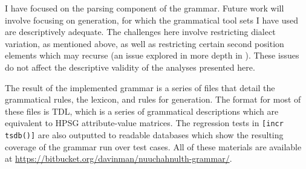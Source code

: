 I have focused on the parsing component of the grammar. Future work will involve focusing on generation, for which the grammatical tool sets I have used are descriptively adequate. The challenges here involve restricting dialect variation, as mentioned above, as well as restricting certain second position elements which may recurse (an issue explored in more depth in \citealt{bender2010reweaving}). These issues do not affect the descriptive validity of the analyses presented here.


The result of the implemented grammar is a series of files that detail the grammatical rules, the lexicon, and rules for generation. The format for most of these files is TDL, which is a series of grammatical descriptions which are equivalent to HPSG attribute-value matrices. The regression tests in \texttt{[incr tsdb()]} \citep{oepen2001} are also outputted to readable databases which show the resulting coverage of the grammar run over test cases. All of these materials are available at \url{https://bitbucket.org/davinman/nuuchahnulth-grammar/}.

